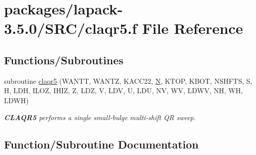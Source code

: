 \hypertarget{claqr5_8f}{}\section{packages/lapack-\/3.5.0/\+S\+R\+C/claqr5.f File Reference}
\label{claqr5_8f}
\subsection*{Functions/\+Subroutines}
\begin{DoxyCompactItemize}
\item 
subroutine \hyperlink{claqr5_8f_a1c97d7cbd416671ed877fc5489dec086}{claqr5} (W\+A\+N\+T\+T, W\+A\+N\+T\+Z, K\+A\+C\+C22, \hyperlink{polmisc_8c_a0240ac851181b84ac374872dc5434ee4}{N}, K\+T\+O\+P, K\+B\+O\+T, N\+S\+H\+F\+T\+S, S, H, L\+D\+H, I\+L\+O\+Z, I\+H\+I\+Z, Z, L\+D\+Z, V, L\+D\+V, U, L\+D\+U, N\+V, W\+V, L\+D\+W\+V, N\+H, W\+H, L\+D\+W\+H)
\begin{DoxyCompactList}\small\item\em {\bfseries C\+L\+A\+Q\+R5} performs a single small-\/bulge multi-\/shift Q\+R sweep. \end{DoxyCompactList}\end{DoxyCompactItemize}


\subsection{Function/\+Subroutine Documentation}
\hypertarget{claqr5_8f_a1c97d7cbd416671ed877fc5489dec086}{}
